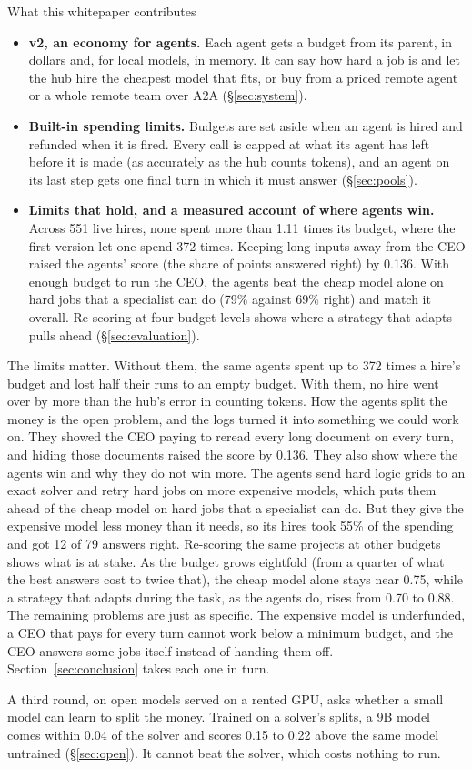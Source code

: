 \begin{keybox}{What this whitepaper contributes}
\begin{itemize}
  \item \textbf{\sys{} v2, an economy for agents.} Each agent gets a budget from its parent, in dollars and, for local
  models, in memory. It can say how hard a job is and let the hub hire the cheapest model that fits, or buy from a
  priced remote agent or a whole remote team over A2A (\S\ref{sec:system}).
  \item \textbf{Built-in spending limits.} Budgets are set aside when an agent is hired and refunded when it is fired.
  Every call is capped at what its agent has left before it is made (as accurately as the hub counts tokens), and an
  agent on its last step gets one final turn in which it must answer (\S\ref{sec:pools}).
  \item \textbf{Limits that hold, and a measured account of where agents win.} Across 551 live hires, none spent more
  than 1.11 times its budget, where the first version let one spend 372 times. Keeping long inputs away from the CEO
  raised the agents' score (the share of points answered right) by 0.136. With enough budget to run the CEO, the agents
  beat the cheap model alone on hard jobs that a specialist can do (79\% against 69\% right) and match it overall.
  Re-scoring at four budget levels shows where a strategy that adapts pulls ahead (\S\ref{sec:evaluation}).
\end{itemize}
\end{keybox}

The limits matter. Without them, the same agents spent up to 372 times a hire's budget and lost half their runs to an
empty budget. With them, no hire went over by more than the hub's error in counting tokens. How the agents split the
money is the open problem, and the logs turned it into something we could work on. They showed the CEO paying to reread
every long document on every turn, and hiding those documents raised the score by 0.136. They also show where the
agents win and why they do not win more. The agents send hard logic grids to an exact solver and retry hard jobs on more
expensive models, which puts them ahead of the cheap model on hard jobs that a specialist can do. But they give the
expensive model less money than it needs, so its hires took 55\% of the spending and got 12 of 79 answers right.
Re-scoring the same projects at other budgets shows what is at stake. As the budget grows eightfold (from a quarter of
what the best answers cost to twice that), the cheap model alone stays near 0.75, while a strategy that adapts during
the task, as the agents do, rises from 0.70 to 0.88. The remaining problems are just as specific. The expensive model
is underfunded, a CEO that pays for every turn cannot work below a minimum budget, and the CEO answers some jobs itself
instead of handing them off. Section~\ref{sec:conclusion} takes each one in turn.

A third round, on open models served on a rented GPU, asks whether a small model can learn to split the money. Trained
on a solver's splits, a 9B model comes within 0.04 of the solver and scores 0.15 to 0.22 above the same model untrained
(\S\ref{sec:open}). It cannot beat the solver, which costs nothing to run.
